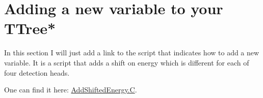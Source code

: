 \documentclass[12pt]{article}
\begin{document}
\clearpage
\section{Adding a new variable to your TTree*}
In this section I will just add a link to the script that indicates how to add a new variable. It is a script that adds a shift on energy which is different for each of four detection heads. 

One can find it here:   \href{https://github.com/kochebina/ROOT_manual_for_Gate_users/blob/master/Materials/AddShiftedEnergy.C}{AddShiftedEnergy.C}. 






%
%
\end{document}
